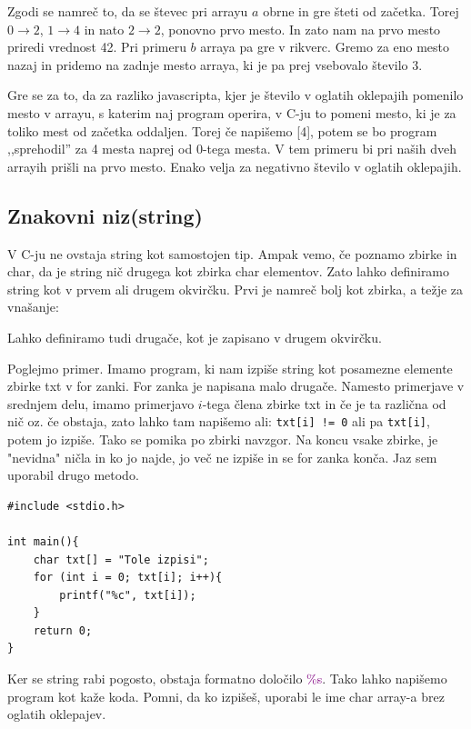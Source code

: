\documentclass[a4paper, 12pt]{article}
\begin{document}
Zgodi se namreč to, da se števec pri arrayu $a$ obrne in gre šteti od začetka. Torej $0 \to 2$, $1 \to 4$ in nato $2 \to 2$, ponovno prvo mesto. In zato nam na prvo mesto priredi vrednost 42. Pri primeru $b$ arraya pa gre v rikverc. Gremo za eno mesto nazaj in pridemo na zadnje mesto arraya, ki je pa prej vsebovalo število 3.

Gre se za to, da za razliko javascripta, kjer je število v oglatih oklepajih pomenilo mesto v arrayu, s katerim naj program operira, v C-ju to pomeni mesto, ki je za toliko mest od začetka oddaljen. Torej če napišemo [4], potem se bo program ,,sprehodil'' za 4 mesta naprej od 0-tega mesta. V tem primeru bi pri naših dveh arrayih prišli na prvo mesto. Enako velja za negativno število v oglatih oklepajih.

\subsection{Znakovni niz(string)}
V C-ju ne ovstaja string kot samostojen tip. Ampak vemo, če poznamo zbirke in char, da je string nič drugega kot zbirka char elementov. Zato lahko definiramo string kot v prvem ali drugem okvirčku. Prvi je namreč bolj kot zbirka, a težje za vnašanje:
\begin{center}
\end{center}

Lahko definiramo tudi drugače, kot je zapisano v drugem okvirčku.

Poglejmo primer. Imamo program, ki nam izpiše string kot posamezne elemente zbirke txt v for zanki. For zanka je napisana malo drugače. Namesto primerjave v srednjem delu, imamo primerjavo $i$-tega člena zbirke txt in če je ta različna od nič oz. če obstaja, zato lahko tam napišemo ali: \texttt{txt[i] != 0} ali pa \texttt{txt[i]}, potem jo izpiše. Tako se pomika po zbirki navzgor. Na koncu vsake zbirke, je "nevidna" ničla in ko jo najde, jo več ne izpiše in se for zanka konča. Jaz sem uporabil drugo metodo.

\begin{lstlisting}
#include <stdio.h>

int main(){
	char txt[] = "Tole izpisi";
	for (int i = 0; txt[i]; i++){
		printf("%c", txt[i]);
	}
	return 0;
}
\end{lstlisting}

Ker se string rabi pogosto, obstaja formatno določilo \textcolor{purple}{\%s}. Tako lahko napišemo program kot kaže koda. Pomni, da ko izpišeš, uporabi le ime char array-a brez oglatih oklepajev.
\end{document}
